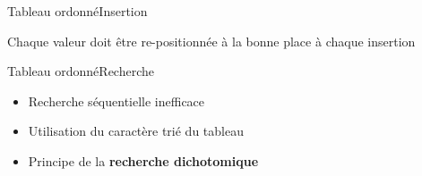 \documentclass[12pt,a4paper,handout]{beamer}
\begin{document}
\begin{frame}{Tableau ordonné}{Insertion}



Chaque valeur doit être re-positionnée à la bonne place à chaque insertion

\end{frame}

\begin{frame}{Tableau ordonné}{Recherche}
\begin{itemize}
\item Recherche séquentielle inefficace
\item Utilisation du caractère trié du tableau
\item Principe de la \textcolor{blueemph}{\textbf{recherche dichotomique}}
\end{itemize}

\end{frame}
\end{document}
